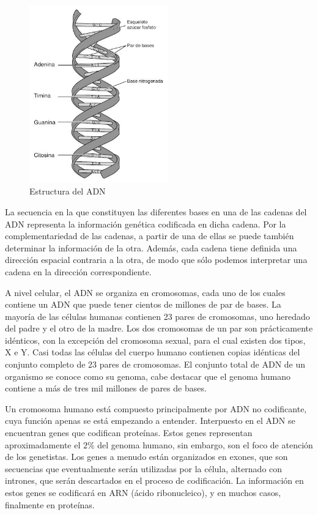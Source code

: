 \begin{figure}[H]
    \centering
    \includegraphics[width=6cm]{img/Estructura_del_ADN.jpg}
    \caption{Estructura del ADN}
\end{figure}

La secuencia en la que constituyen las diferentes bases en una de las cadenas del ADN representa la información genética codificada en dicha cadena. Por la complementariedad de las cadenas, a partir de una de ellas se puede también determinar la información de la otra. Además, cada cadena tiene definida una dirección espacial contraria a la otra, de modo que sólo podemos interpretar una cadena en la dirección correspondiente.

A nivel celular, el ADN se organiza en cromosomas, cada uno de los cuales contiene un ADN que puede tener cientos de millones de par de bases. La mayoría de las células humanas contienen 23 pares de cromosomas, uno heredado del padre y el otro de la madre. Los dos cromosomas de un par son prácticamente idénticos, con la excepción del cromosoma sexual, para el cual existen dos tipos, X e Y. Casi todas las células del cuerpo humano contienen copias idénticas del conjunto completo de 23 pares de cromosomas. El conjunto total de ADN de un organismo se conoce como su genoma, cabe destacar que el genoma humano contiene a más de tres mil millones de pares de bases.

Un cromosoma humano está compuesto principalmente por ADN no codificante, cuya función apenas se está empezando a entender. Interpuesto en el ADN se encuentran genes que codifican proteínas. Estos genes representan aproximadamente el $2\%$ del genoma humano, sin embargo, son el foco de atención de los genetistas. Los genes a menudo están organizados en exones, que son secuencias que eventualmente serán utilizadas por la célula, alternado con intrones, que serán descartados en el proceso de codificación. La información en estos genes se codificará en ARN (ácido ribonucleico), y en muchos casos, finalmente en proteínas.

